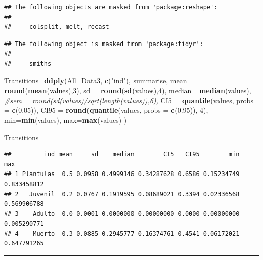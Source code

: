 \documentclass[
]{book}
\newenvironment{Shaded}{\begin{snugshade}}{\end{snugshade}}
\newcommand{\AttributeTok}[1]{\textcolor[rgb]{0.13,0.29,0.53}{#1}}
\newcommand{\CommentTok}[1]{\textcolor[rgb]{0.56,0.35,0.01}{\textit{#1}}}
\newcommand{\DecValTok}[1]{\textcolor[rgb]{0.00,0.00,0.81}{#1}}
\newcommand{\FloatTok}[1]{\textcolor[rgb]{0.00,0.00,0.81}{#1}}
\newcommand{\FunctionTok}[1]{\textcolor[rgb]{0.13,0.29,0.53}{\textbf{#1}}}
\newcommand{\NormalTok}[1]{#1}
\newcommand{\OtherTok}[1]{\textcolor[rgb]{0.56,0.35,0.01}{#1}}
\newcommand{\StringTok}[1]{\textcolor[rgb]{0.31,0.60,0.02}{#1}}
\theoremstyle{definition}
\theoremstyle{definition}
\theoremstyle{definition}
\theoremstyle{definition}
\theoremstyle{remark}
\begin{document}
\begin{verbatim}
## The following objects are masked from 'package:reshape':
## 
##     colsplit, melt, recast
\end{verbatim}

\begin{verbatim}
## The following object is masked from 'package:tidyr':
## 
##     smiths
\end{verbatim}

\begin{Shaded}
\begin{Highlighting}[]
\NormalTok{Transitions}\OtherTok{=}\FunctionTok{ddply}\NormalTok{(All\_Data3, }\FunctionTok{c}\NormalTok{(}\StringTok{"ind"}\NormalTok{), summarise,}
            \AttributeTok{mean =} \FunctionTok{round}\NormalTok{(}\FunctionTok{mean}\NormalTok{(values),}\DecValTok{3}\NormalTok{), }\AttributeTok{sd =} \FunctionTok{round}\NormalTok{(}\FunctionTok{sd}\NormalTok{(values),}\DecValTok{4}\NormalTok{),}
            \AttributeTok{median=} \FunctionTok{median}\NormalTok{(values),}
            \CommentTok{\#sem = round(sd(values)/sqrt(length(values)),6),}
            \AttributeTok{CI5 =} \FunctionTok{quantile}\NormalTok{(values, }\AttributeTok{probs =} \FunctionTok{c}\NormalTok{(}\FloatTok{0.05}\NormalTok{)),}
            \AttributeTok{CI95 =} \FunctionTok{round}\NormalTok{(}\FunctionTok{quantile}\NormalTok{(values, }\AttributeTok{probs =} \FunctionTok{c}\NormalTok{(}\FloatTok{0.95}\NormalTok{)), }\DecValTok{4}\NormalTok{),}
            \AttributeTok{min=}\FunctionTok{min}\NormalTok{(values),}
            \AttributeTok{max=}\FunctionTok{max}\NormalTok{(values)}
\NormalTok{            )}

\NormalTok{Transitions}
\end{Highlighting}
\end{Shaded}

\begin{verbatim}
##         ind mean     sd    median        CI5   CI95        min         max
## 1 Plantulas  0.5 0.0958 0.4999146 0.34287628 0.6586 0.15234749 0.833458812
## 2   Juvenil  0.2 0.0767 0.1919595 0.08689021 0.3394 0.02336568 0.569906788
## 3    Adulto  0.0 0.0001 0.0000000 0.00000000 0.0000 0.00000000 0.005290771
## 4    Muerto  0.3 0.0885 0.2945777 0.16374761 0.4541 0.06172021 0.647791265
\end{verbatim}

\begin{center}\rule{0.5\linewidth}{0.5pt}\end{center}
\end{document}
